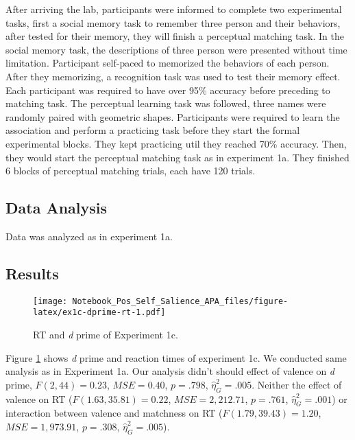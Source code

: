 \documentclass[man]{apa6}
\begin{document}
After arriving the lab, participants were informed to complete two experimental tasks, first a social memory task to remember three person and their behaviors, after tested for their memory, they will finish a perceptual matching task.
In the social memory task, the descriptions of three person were presented without time limitation. Participant self-paced to memorized the behaviors of each person. After they memorizing, a recognition task was used to test their memory effect. Each participant was required to have over 95\% accuracy before preceding to matching task.
The perceptual learning task was followed, three names were randomly paired with geometric shapes. Participants were required to learn the association and perform a practicing task before they start the formal experimental blocks. They kept practicing util they reached 70\% accuracy. Then, they would start the perceptual matching task as in experiment 1a. They finished 6 blocks of perceptual matching trials, each have 120 trials.

\hypertarget{data-analysis-3}{%
\subsection{Data Analysis}\label{data-analysis-3}}

Data was analyzed as in experiment 1a.

\hypertarget{results-2}{%
\subsection{Results}\label{results-2}}

\begin{figure}
\centering
\texttt{[image: Notebook\_Pos\_Self\_Salience\_APA\_files/figure-latex/ex1c-dprime-rt-1.pdf]}
\caption{\label{fig:ex1c-dprime-rt}RT and \emph{d} prime of Experiment 1c.}
\end{figure}

Figure \ref{fig:ex1c-dprime-rt} shows \emph{d} prime and reaction times of experiment 1c. We conducted same analysis as in Experiment 1a. Our analysis didn't should effect of valence on \emph{d} prime, \(F(2, 44) = 0.23\), \(\mathit{MSE} = 0.40\), \(p = .798\), \(\hat{\eta}^2_G = .005\). Neither the effect of valence on RT (\(F(1.63, 35.81) = 0.22\), \(\mathit{MSE} = 2,212.71\), \(p = .761\), \(\hat{\eta}^2_G = .001\)) or interaction between valence and matchness on RT (\(F(1.79, 39.43) = 1.20\), \(\mathit{MSE} = 1,973.91\), \(p = .308\), \(\hat{\eta}^2_G = .005\)).
\end{document}
